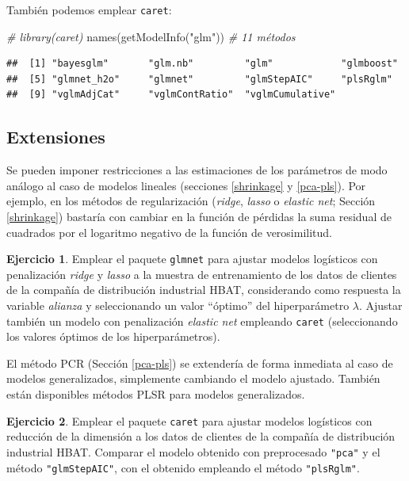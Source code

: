 \documentclass[
  spanish,
]{book}
\newenvironment{Shaded}{\begin{snugshade}}{\end{snugshade}}
\newcommand{\CommentTok}[1]{\textcolor[rgb]{0.56,0.35,0.01}{\textit{#1}}}
\newcommand{\FunctionTok}[1]{\textcolor[rgb]{0.00,0.00,0.00}{#1}}
\newcommand{\NormalTok}[1]{#1}
\newcommand{\StringTok}[1]{\textcolor[rgb]{0.31,0.60,0.02}{#1}}
\theoremstyle{break}
\theoremstyle{definition}
\theoremstyle{definition}
\theoremstyle{definition}
\newtheorem{exercise}{Ejercicio}[chapter]
\theoremstyle{definition}
\theoremstyle{remark}
\begin{document}
También podemos emplear \texttt{caret}:

\begin{Shaded}
\begin{Highlighting}[]
\CommentTok{\# library(caret)}
\FunctionTok{names}\NormalTok{(}\FunctionTok{getModelInfo}\NormalTok{(}\StringTok{"glm"}\NormalTok{)) }\CommentTok{\# 11 métodos}
\end{Highlighting}
\end{Shaded}

\begin{verbatim}
##  [1] "bayesglm"       "glm.nb"         "glm"            "glmboost"      
##  [5] "glmnet_h2o"     "glmnet"         "glmStepAIC"     "plsRglm"       
##  [9] "vglmAdjCat"     "vglmContRatio"  "vglmCumulative"
\end{verbatim}

\hypertarget{extensiones}{%
\subsection{Extensiones}\label{extensiones}}

Se pueden imponer restricciones a las estimaciones de los parámetros de modo análogo al caso de modelos lineales (secciones \ref{shrinkage} y \ref{pca-pls}).
Por ejemplo, en los métodos de regularización (\emph{ridge}, \emph{lasso} o \emph{elastic net}; Sección \ref{shrinkage}) bastaría con cambiar en la función de pérdidas la suma residual de cuadrados por el logaritmo negativo de la función de verosimilitud.

\begin{exercise}
\protect\hypertarget{exr:glmnet}{}{\label{exr:glmnet} }
Emplear el paquete \texttt{glmnet} para ajustar modelos logísticos con penalización \emph{ridge} y \emph{lasso} a la muestra de entrenamiento de los datos de clientes de la compañía de distribución industrial HBAT, considerando como respuesta la variable \emph{alianza} y seleccionando un valor ``óptimo'' del hiperparámetro \(\lambda\).
Ajustar también un modelo con penalización \emph{elastic net} empleando \texttt{caret} (seleccionando los valores óptimos de los hiperparámetros).
\end{exercise}

El método PCR (Sección \ref{pca-pls}) se extendería de forma inmediata al caso de modelos generalizados, simplemente cambiando el modelo ajustado.
También están disponibles métodos PLSR para modelos generalizados.

\begin{exercise}
\protect\hypertarget{exr:glm-reduccion}{}{\label{exr:glm-reduccion} }
Emplear el paquete \texttt{caret} para ajustar modelos logísticos con reducción de la dimensión a los datos de clientes de la compañía de distribución industrial HBAT. Comparar el modelo obtenido con preprocesado \texttt{"pca"} y el método \texttt{"glmStepAIC"}, con el obtenido empleando el método \texttt{"plsRglm"}.
\end{exercise}
\end{document}
